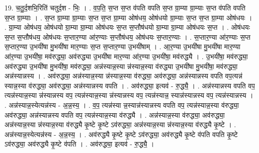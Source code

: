 \documentclass[17pt]{extarticle}
\begin{document}
19. च॒तु॒र्द॒शभि॒रिति॑ चतुर्द॒श - भिः॒ । . व॒प॒ति॒ स॒प्त स॒प्त व॑पति वपति स॒प्त ग्रा॒म्या ग्रा॒म्याः स॒प्त व॑पति वपति स॒प्त ग्रा॒म्याः । . स॒प्त ग्रा॒म्या ग्रा॒म्याः स॒प्त स॒प्त ग्रा॒म्या ओष॑धय॒ ओष॑धयो ग्रा॒म्याः स॒प्त स॒प्त ग्रा॒म्या ओष॑धयः । . ग्रा॒म्या ओष॑धय॒ ओष॑धयो ग्रा॒म्या ग्रा॒म्या ओष॑धयः स॒प्त स॒प्तौष॑धयो ग्रा॒म्या ग्रा॒म्या ओष॑धयः स॒प्त । . ओष॑धयः स॒प्त स॒प्तौष॑धय॒ ओष॑धयः स॒प्तार॒ण्या आ॑र॒ण्याः स॒प्तौष॑धय॒ ओष॑धयः स॒प्तार॒ण्याः । . स॒प्तार॒ण्या आ॑र॒ण्याः स॒प्त स॒प्तार॒ण्या उ॒भयी॑षा मु॒भयी॑षा मार॒ण्याः स॒प्त स॒प्तार॒ण्या उ॒भयी॑षाम् । . आ॒र॒ण्या उ॒भयी॑षा मु॒भयी॑षा मार॒ण्या आ॑र॒ण्या उ॒भयी॑षा॒ मव॑रुद्ध्या॒ अव॑रुद्ध्या उ॒भयी॑षा मार॒ण्या आ॑र॒ण्या उ॒भयी॑षा॒ मव॑रुद्ध्यै । . उ॒भयी॑षा॒ मव॑रुद्ध्या॒ अव॑रुद्ध्या उ॒भयी॑षा मु॒भयी॑षा॒ मव॑रुद्ध्या॒ 
अन्न॑स्यान्न॒स्या न्न॑स्यान्न॒स्या व॑रुद्ध्या उ॒भयी॑षा मु॒भयी॑षा॒ मव॑रुद्ध्या॒ अन्न॑स्यान्नस्य । . अव॑रुद्ध्या॒ अन्न॑स्यान्न॒स्या न्न॑स्यान्न॒स्या व॑रुद्ध्या॒ अव॑रुद्ध्या॒ अन्न॑स्यान्नस्य वपति वप॒त्यन्न॑ स्यान्न॒स्या व॑रुद्ध्या॒ अव॑रुद्ध्या॒ अन्न॑स्यान्नस्य वपति । . अव॑रुद्ध्या॒ इत्यव॑ - रु॒द्ध्यै॒ । . अन्न॑स्यान्नस्य वपति वप॒ त्यन्न॑स्यान्न॒स्या न्न॑स्यान्नस्य वप॒ त्यन्न॑स्यान्न॒स्या न्न॑स्यान्नस्य वप॒ त्यन्न॑स्यान्न॒ स्यान्न॑स्यान्नस्य वप॒ त्यन्न॑स्यान्नस्य । . अन्न॑स्यान्न॒स्येत्यन्न॑स्य - अ॒न्न॒स्य॒ । . व॒प॒ त्यन्न॑स्या न्न॒स्यान्न॑स्यान्नस्य वपति वप॒ त्यन्न॑स्यान्न॒स्या व॑रुद्ध्या॒ अव॑रुद्ध्या॒ अन्न॑स्यान्नस्य वपति वप॒ त्यन्न॑स्यान्न॒स्या व॑रुद्ध्यै । . अन्न॑स्यान्न॒स्या व॑रुद्ध्या॒ अव॑रुद्ध्या॒ अन्न॑स्यान्न॒स्या न्न॑स्यान्न॒स्या व॑रुद्ध्यै कृ॒ष्टे कृ॒ष्टे ऽव॑रुद्ध्या॒ अन्न॑स्यान्न॒स्या न्न॑स्यान्न॒स्या व॑रुद्ध्यै कृ॒ष्टे । . अन्न॑स्यान्न॒स्येत्यन्न॑स्य - अ॒न्न॒स्य॒ । . अव॑रुद्ध्यै कृ॒ष्टे कृ॒ष्टे ऽव॑रुद्ध्या॒ अव॑रुद्ध्यै कृ॒ष्टे व॑पति वपति कृ॒ष्टे ऽव॑रुद्ध्या॒ अव॑रुद्ध्यै कृ॒ष्टे व॑पति । . अव॑रुद्ध्या॒ इत्यव॑ - रु॒द्ध्यै॒ । \newline
\end{document}

